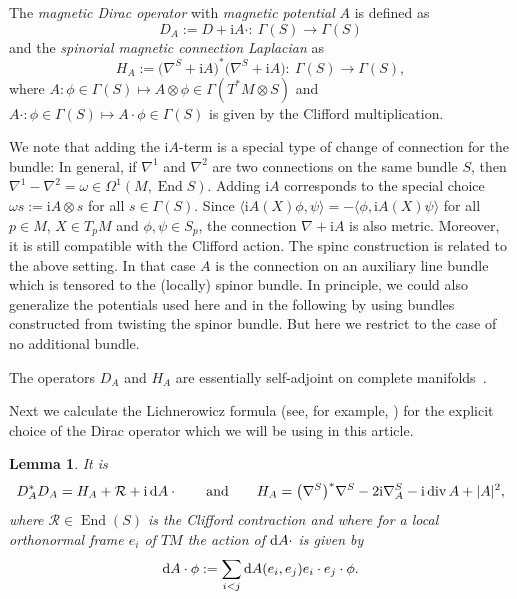 \documentclass[10pt,a4paper]{amsart}
\numberwithin{equation}{section}
\newtheorem{Lemma}[Theorem]{Lemma}
\begin{document}
The \emph{magnetic Dirac operator} with \emph{magnetic potential} $A$ is defined as
\[ D_{A}:= D+ {\mathrm{i}}A\cdot \colon \ \Gamma(S)\to \Gamma(S) \]
and the \emph{spinorial magnetic connection Laplacian} as
\[ H_{A} := \bigl(\nabla^S + {\mathrm{i}}A\bigr)^*\bigl(\nabla^S + {\mathrm{i}}A \bigr) \colon \ \Gamma(S)\to \Gamma(S),\]
where $A\colon \phi\in \Gamma(S)\mapsto A\otimes \phi \in \Gamma(T^*M\otimes S)$ and $A\cdot \colon \phi \in \Gamma(S) \mapsto A\cdot \phi \in \Gamma(S)$ is given by the Clifford multiplication.

\begin{Remark}\label{rem_diff_conn} We note that adding the ${\mathrm{i}}A$-term is a special type of change of connection for the bundle: In general, if $\nabla^1$ and $\nabla^2$ are two connections on the same bundle $S$, then $\nabla^1-\nabla^2=\omega\in \Omega^1 (M, \operatorname{End} S)$. Adding ${\mathrm{i}}A$ corresponds to the special choice $\omega s:= {\mathrm{i}} A\otimes s$ for all $s\in \Gamma(S)$. Since $\langle {\mathrm{i}}A(X)\phi,\psi\rangle=-\langle\phi, {\mathrm{i}}A(X) \psi\rangle$ for all $p\in M$, $X\in T_p M$ and $\phi, \psi\in S_p$, the connection $\nabla +{\mathrm{i}}A$ is also metric. Moreover, it is still compatible with the Clifford action.
The spinc construction is related to the above setting. In that case $A$ is the connection on an auxiliary line bundle which is tensored to the (locally) spinor bundle. In principle, we could also generalize the potentials used here and in the following by using bundles constructed from twisting the spinor bundle. But here we restrict to the case of no additional bundle.\end{Remark}

The operators $D_A$ and $H_A$ are essentially self-adjoint on complete manifolds~\cite[pp.~411--412]{Chernoff}.

Next we calculate the Lichnerowicz formula (see, for example, \cite{LM,Roe}) for the explicit choice of the Dirac operator which we will be using in this article.

\begin{Lemma}\label{lem_DAsquare} It is
\[ D_A^*D_A = H_A + \mathcal{R} + {\mathrm{i}} \, {\rm d}A\cdot\qquad \text{and}\qquad H_{A} = \bigl(\nabla^S\bigr)^*\nabla^S -2{\mathrm{i}}  \nabla_A^S -{\mathrm{i}}  \operatorname{div} A +|A|^2, \]
where $\mathcal{R}\in \operatorname{End}(S)$ is the Clifford contraction and where for a local orthonormal frame $e_i$ of $TM$ the action of ${\rm d}A\cdot$ is given by \[{\rm d}A\cdot \phi := \sum_{i<j} {\rm d}A(e_i,e_j)e_i\cdot e_j\cdot \phi.\]
\end{Lemma}
\end{document}
